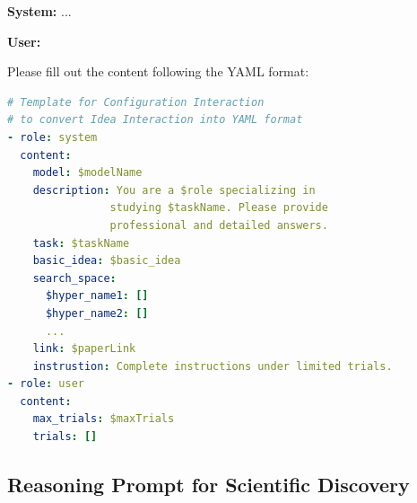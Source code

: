 \begin{tcolorbox}[breakable,colback=orange!5!white, colframe=black, title=User Agent Prompt for Configuration Interaction]

\textbf{System:} ...

\textbf{User:}


Please fill out the content following the YAML format:

\begin{bg_yaml}
\begin{minipage}{1.0\linewidth}
\begin{lstlisting}[style=yamlstyle, language=Yaml]
# Template for Configuration Interaction 
# to convert Idea Interaction into YAML format
- role: system
  content:
    model: $modelName
    description: You are a $role specializing in 
                studying $taskName. Please provide 
                professional and detailed answers.
    task: $taskName
    basic_idea: $basic_idea
    search_space:
      $hyper_name1: []
      $hyper_name2: []
      ...
    link: $paperLink
    instrustion: Complete instructions under limited trials.
- role: user
  content:
    max_trials: $maxTrials
    trials: []
\end{lstlisting}
\end{minipage}
\end{bg_yaml}
\label{selfai_yaml}


\end{tcolorbox}


\subsection{Reasoning Prompt for Scientific Discovery}
\label{sec:supp_cognitive}

